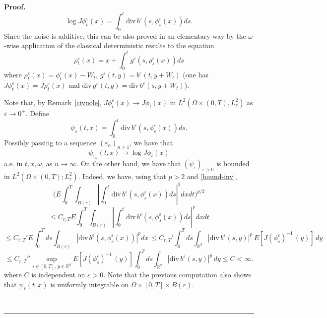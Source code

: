 \documentclass[a4paper,11pt]{article}
\newenvironment{proof}[1][Proof]{\textbf{#1.} }{\ \rule{0.5em}{0.5em}}
\newcommand{\RR}{\mathbb{R}}
\newcommand{\eps}{\varepsilon}
\begin{document}
\begin{proof}
\begin{equation*}
\log J\phi _{t}^{\varepsilon
}(x)=\int_{0}^{t}\mathrm{div}\,b^{\varepsilon }(s,\phi
_{s}^{\varepsilon }(x))ds.
\end{equation*}
Since the noise is additive, this can be also proved in an
elementary way by the $\omega $-wise application of the classical
deterministic results to the equation
\begin{equation*}
\rho _{t}^{\varepsilon }(x)=x+\int_{0}^{t}g^{\varepsilon }\left(
s,\rho _{s}^{\varepsilon }(x)\right) ds
\end{equation*}
where $\rho _{t}^{\varepsilon }(x)=\phi _{t}^{\varepsilon }(x)-W_{t}$, $%
g^{\varepsilon }\left( t,y\right) =b^{\varepsilon }(t,y+W_{t})$ (one has $%
J\phi _{t}^{\varepsilon }(x)=J\rho_{t}^{\varepsilon }(x)$ and $\mathrm{div}%
\,g^{\varepsilon }\left( t,y\right) =\mathrm{div}\,b^{\varepsilon
}(s,y+W_{t})$).

Note that, by  Remark~\ref{civuole},
$
J\phi _{t}^{\varepsilon }(x) \to  J\phi _{t}^{}(x)
$
in $L^{2}(\Omega \times (0,T),L_{r}^{2})$ as $\eps \to 0^+$. Define
$$
\psi_{\eps}(t,x)= \int_{0}^{t} \mathrm{div}\,b^{\varepsilon }\left(
s,{\phi }_{s}^{\varepsilon }\left( x\right) \right) ds.
$$
 Possibly passing to a sequence $(\eps_n)_{n\ge 1}$, we have
 that
\begin{equation}\label{fr6}
\psi_{{\eps_n}}(t,x) \to \log J\phi _{t}^{}(x)
 \end{equation} a.e. in $t, x,
\omega$, as $n \to \infty$.  On the other hand,  we have that
 $\left( \psi _{\varepsilon
}\right) _{\varepsilon >0}$ is bounded in $L^{2}(\Omega \times
(0,T);L_{r}^{2})$.
 Indeed, we have, using that $p>2$ and \eqref{bound-inv},
$$
\Big ( E \int_{0}^{T}\int_{B(r)} \left|
 \int_{0}^{t}  \mathrm{div}\,b^{\varepsilon }\left( s,{\phi
}_{s}^{\varepsilon }\left( x\right) \right)ds
   \right| ^{2} dxdt \Big )^{p/2}
$$
$$
\le C_{r, T}  E \int_{0}^{T}\int_{B(r)} \left|
 \int_{0}^{t}  \mathrm{div}\,b^{\varepsilon }\left( s,{\phi
}_{s}^{\varepsilon }\left( x\right) \right)ds
   \right| ^{p} dxdt
$$
$$
\le C_{r, T}'   E \int_{0}^{T} ds\int_{B(r)} \left|
   \mathrm{div}\,b^{\varepsilon }\left( s,{\phi
}_{s}^{\varepsilon }\left( x\right) \right)
   \right| ^{p} dx  \, \le
   C_{r, T}'   \int_{0}^{T} ds\int_{\RR^d} |
   \mathrm{div}\,b^{\varepsilon }\left( s,y
   \right)|^p \, E[ J (\phi_s^{\eps})^{-1}\, (y)]
   \, dy
$$
$$
\le
   C_{r, T}''   \sup_{s \in [0,T] , \, y \in \RR^d}
   E[ J (\phi_s^{\eps})^{-1}\, (y)]
    \int_{0}^{T} ds\int_{\RR^d} |
   \mathrm{div}\,b^{\varepsilon }\left( s,y
   \right)|^p
   \, dy \le C  < \infty.
$$
where $C$ is independent on $\eps >0$. Note that the previous
computation also  shows that  $\psi_{\eps}(t,x)  $ is uniformly
integrable on
  $\Omega \times [0,T] \times B(r)$.


\end{proof}
\end{document}
